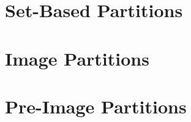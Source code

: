 \begin{figure}
  {\small
   
  }
  \caption{}
  \label{fig:pbr}
\end{figure}


\section{Set-Based Partitions}
\label{sec:set}

\begin{figure}
  {\small
   
  }
  \caption{}
  \label{fig:sets}
\end{figure}


\section{Image Partitions}
\label{sec:image}

\begin{figure}
  {\small
    
  }
  \caption{}
  \label{fig:image}
\end{figure}

\section{Pre-Image Partitions}
\label{sec:preimage}

\begin{figure}
  {\small
   
  }
  \caption{}
  \label{fig:preimage}
\end{figure}

